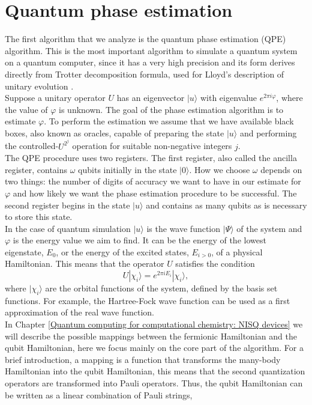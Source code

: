 \section{Quantum phase estimation}
The first algorithm that we analyze is the quantum phase estimation (QPE) algorithm. This is the most important algorithm to simulate a quantum system on a quantum computer, since it has a very high precision and its form derives directly from Trotter decomposition formula, used for Lloyd's description of unitary evolution \cite{Lloyd1996Aug}. \\
Suppose a unitary operator $U$ has an eigenvector $|u\rangle$ with eigenvalue $e^{2\pi i\varphi}$, where the value of $\varphi$ is unknown. The goal of the phase estimation algorithm is to estimate $\varphi$. To perform the estimation we assume that we have available black boxes, also known as oracles, capable of preparing the state $|u\rangle$ and performing the controlled-$U^{2^j}$ operation for suitable non-negative integers $j$. \\
The QPE procedure uses two registers. The first register, also called the ancilla register, contains $\omega$ qubits initially in the state $|0\rangle$. How we choose $\omega$ depends on two things: the number of digits of accuracy we want to have in our estimate for $\varphi$ and how likely we want the phase estimation procedure to be successful. The second register begins in the state $|u\rangle$ and contains as many qubits as is necessary to store this state. \\
In the case of quantum simulation $|u\rangle$ is the wave function $|\Psi\rangle$ of the system and $\varphi$ is the energy value we aim to find. It can be the energy of the lowest eigenstate, $E_0$, or the energy of the excited states, $E_{i>0}$, of a physical Hamiltonian. This means that the operator $U$ satisfies the condition
\begin{equation}
    U |\chi_i\rangle = e^{2\pi i E_i} |\chi_i\rangle,
\end{equation}
where $|\chi_i\rangle$ are the orbital functions of the system, defined by the basis set functions. For example, the Hartree-Fock wave function can be used as a first approximation of the real wave function. \\
In Chapter \ref{Quantum computing for computational chemistry: NISQ devices} we will describe the possible mappings between the fermionic Hamiltonian and the qubit Hamiltonian, here we focus mainly on the core part of the algorithm. For a brief introduction, a mapping is a function that transforms the many-body Hamiltonian into the qubit Hamiltonian, this means that the second quantization operators are transformed into Pauli operators. Thus, the qubit Hamiltonian can be written as a linear combination of Pauli strings,
